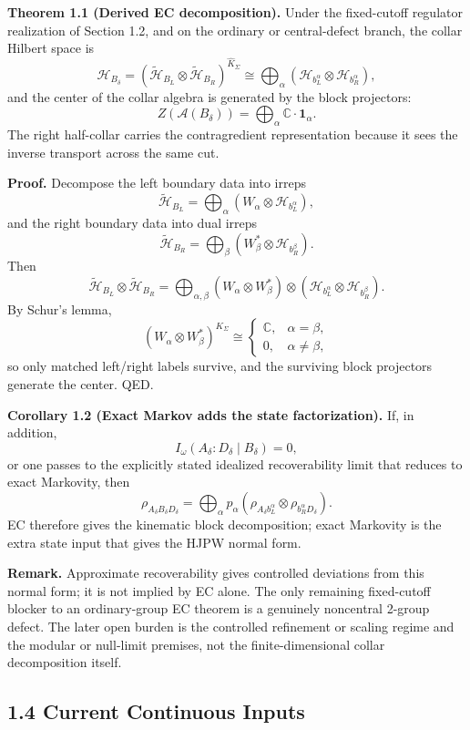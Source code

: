 \textbf{Theorem 1.1 (Derived EC decomposition).} Under the fixed-cutoff regulator realization of Section 1.2, and on the ordinary or central-defect branch, the collar Hilbert space is
\[
\mathcal H_{B_\delta}
=
(\tilde{\mathcal H}_{B_L}\otimes \tilde{\mathcal H}_{B_R})^{\widehat K_\Sigma}
\cong
\bigoplus_{\alpha}
\left(\mathcal H_{b_L^\alpha}\otimes \mathcal H_{b_R^\alpha}\right),
\]
and the center of the collar algebra is generated by the block projectors:
\[
Z(\mathcal A(B_\delta))
=
\bigoplus_\alpha \mathbb C\cdot \mathbf 1_\alpha.
\]
The right half-collar carries the contragredient representation because it sees the inverse transport across the same cut.

\textbf{Proof.} Decompose the left boundary data into irreps
\[
\tilde{\mathcal H}_{B_L}
=
\bigoplus_\alpha
\left(W_\alpha\otimes \mathcal H_{b_L^\alpha}\right),
\]
and the right boundary data into dual irreps
\[
\tilde{\mathcal H}_{B_R}
=
\bigoplus_\beta
\left(W_\beta^*\otimes \mathcal H_{b_R^\beta}\right).
\]
Then
\[
\tilde{\mathcal H}_{B_L}\otimes \tilde{\mathcal H}_{B_R}
=
\bigoplus_{\alpha,\beta}
(W_\alpha\otimes W_\beta^*)\otimes
(\mathcal H_{b_L^\alpha}\otimes \mathcal H_{b_R^\beta}).
\]
By Schur's lemma,
\[
(W_\alpha\otimes W_\beta^*)^{\widehat K_\Sigma}
\cong
\begin{cases}
\mathbb C, & \alpha=\beta,\\
0, & \alpha\neq \beta,
\end{cases}
\]
so only matched left/right labels survive, and the surviving block projectors generate the center. QED.

\textbf{Corollary 1.2 (Exact Markov adds the state factorization).} If, in addition,
\[
I_\omega(A_\delta:D_\delta\mid B_\delta)=0,
\]
or one passes to the explicitly stated idealized recoverability limit that reduces to exact Markovity, then
\[
\rho_{A_\delta B_\delta D_\delta}
=
\bigoplus_\alpha p_\alpha
\left(\rho_{A_\delta b_L^\alpha}\otimes \rho_{b_R^\alpha D_\delta}\right).
\]
EC therefore gives the kinematic block decomposition; exact Markovity is the extra state input that gives the HJPW normal form.

\textbf{Remark.} Approximate recoverability gives controlled deviations from this normal form; it is not implied by EC alone. The only remaining fixed-cutoff blocker to an ordinary-group EC theorem is a genuinely noncentral 2-group defect. The later open burden is the controlled refinement or scaling regime and the modular or null-limit premises, not the finite-dimensional collar decomposition itself.
\subsection{1.4 Current Continuous Inputs}\label{14-fundamental-parameters}

